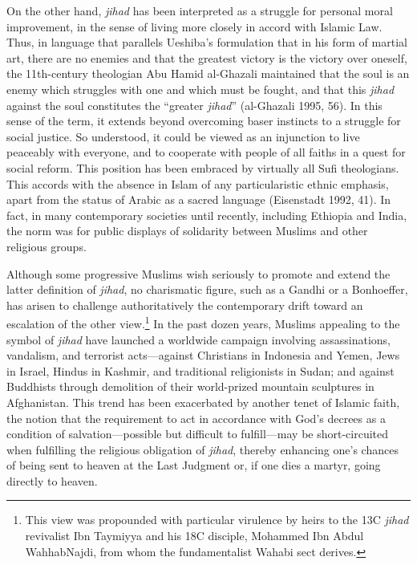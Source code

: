 On the other hand, \emph{jihad} has been interpreted as a struggle for personal moral improvement, in the sense of living more closely in accord with Islamic Law. Thus, in language that parallels Ueshiba's formulation that in his form of martial art, there are no enemies and that the greatest victory is the victory over oneself, the 11th-century theologian Abu Hamid al-Ghazali maintained that the soul is an enemy which struggles with one and which must be fought, and that this \emph{jihad} against the soul constitutes the ``greater \emph{jihad}'' (al-Ghazali 1995, 56). In this sense of the term, it extends beyond overcoming baser instincts to a struggle for social justice. So understood, it could be viewed as an injunction to live peaceably with everyone, and to cooperate with people of all faiths in a quest for social reform. This position has been embraced by virtually all Sufi theologians. This accords with the absence in Islam of any particularistic ethnic emphasis, apart from the status of Arabic as a sacred language (Eisenstadt 1992, 41). In fact, in many contemporary societies until recently, including Ethiopia and India, the norm was for public displays of solidarity between Muslims and other religious groups.

Although some progressive Muslims wish seriously to promote and extend the latter definition of \emph{jihad}, no charismatic figure, such as a Gandhi or a Bonhoeffer, has arisen to challenge authoritatively the contemporary drift toward an escalation of the other view.\footnote{This view was propounded with particular virulence by heirs to the 13C \emph{jihad} revivalist Ibn Taymiyya and his 18C disciple, Mohammed Ibn Abdul WahhabNajdi, from whom the fundamentalist Wahabi sect derives.} In the past dozen years, Muslims appealing to the symbol of \emph{jihad} have launched a worldwide campaign involving assassinations, vandalism, and terrorist acts---against Christians in Indonesia and Yemen, Jews in Israel, Hindus in Kashmir, and traditional religionists in Sudan; and against Buddhists through demolition of their world-prized mountain sculptures in Afghanistan. This trend has been exacerbated by another tenet of Islamic faith, the notion that the requirement to act in accordance with God's decrees as a condition of salvation---possible but difficult to fulfill---may be short-circuited when fulfilling the religious obligation of \emph{jihad}, thereby enhancing one's chances of being sent to heaven at the Last Judgment or, if one dies a martyr, going directly to heaven. 

